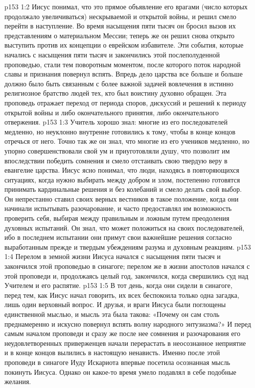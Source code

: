\vs p153 1:2 Иисус понимал, что это прямое объявление его врагами (число которых продолжало увеличиваться) нескрываемой и открытой войны, и решил смело перейти в наступление. Во время насыщения пяти тысяч он бросил вызов их представлениям о материальном Мессии; теперь же он решил снова открыто выступить против их концепции о еврейском избавителе. Эти события, которые начались с насыщения пяти тысяч и закончились этой послеполуденной проповедью, стали тем поворотным моментом, после которого поток народной славы и признания повернул вспять. Впредь дело царства все больше и больше должно было быть связанным с более важной задачей вовлечения в истинно религиозное братство людей тех, кто был воистину духовно обращен. Эта проповедь отражает переход от периода споров, дискуссий и решений к периоду открытой войны и либо окончательного принятия, либо окончательного отвержения.
\vs p153 1:3 Учитель хорошо знал: многие из его последователей медленно, но неуклонно внутренне готовились к тому, чтобы в конце концов отречься от него. Точно так же он знал, что многие из его учеников медленно, но упорно совершенствовали свой ум и приуготовляли душу, что позволит им впоследствии победить сомнения и смело отстаивать свою твердую веру в евангелие царства. Иисус ясно понимал, что люди, находясь в повторяющихся ситуациях, когда нужно выбирать между добром и злом, постепенно готовятся принимать кардинальные решения и без колебаний и смело делать свой выбор. Он непрестанно ставил своих верных вестников в такое положение, когда они начинали испытывать разочарование, и часто предоставлял им возможность проверить себя, выбирая между правильным и ложным путем преодоления духовных испытаний. Он знал, что может положиться на своих последователей, ибо в последнем испытании они примут свои важнейшие решения согласно выработанным прежде и твердым убеждениям разума и духовным реакциям.
\vs p153 1:4 \pc Перелом в земной жизни Иисуса начался с насыщения пяти тысяч и закончился этой проповедью в синагоге; перелом же в жизни апостолов начался с этой проповеди и, продолжаясь целый год, закончился, когда свершились суд над Учителем и его распятие.
\vs p153 1:5 \pc В тот день, когда они сидели в синагоге, перед тем, как Иисус начал говорить, их всех беспокоила только одна загадка, лишь один верховный вопрос. И друзья, и враги Иисуса были поглощены единственной мыслью, и мысль эта была такова: «Почему он сам столь преднамеренно и искусно повернул вспять волну народного энтузиазма?» И перед самым началом проповеди и сразу же после нее сомнения и разочарования его неудовлетворенных приверженцев начали перерастать в неосознанное неприятие и в конце концов вылились в настоящую ненависть. Именно после этой проповеди в синагоге Иуду Искариота впервые посетила осознанная мысль покинуть Иисуса. Однако он какое\hyp{}то время умело подавлял в себе подобные желания.
